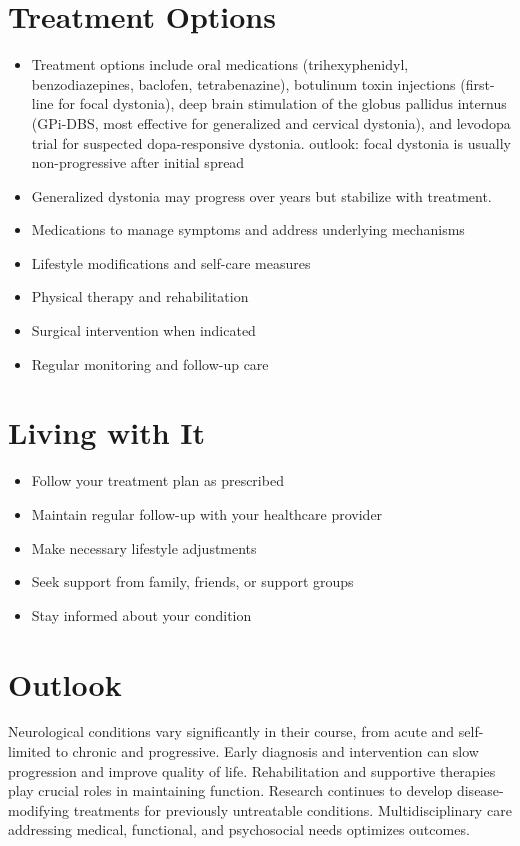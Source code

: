 \section{Treatment Options}
\begin{itemize}[noitemsep]
  \item Treatment options include oral medications (trihexyphenidyl, benzodiazepines, baclofen, tetrabenazine), botulinum toxin injections (first-line for focal dystonia), deep brain stimulation of the globus pallidus internus (GPi-DBS, most effective for generalized and cervical dystonia), and levodopa trial for suspected dopa-responsive dystonia. outlook: focal dystonia is usually non-progressive after initial spread
  \item Generalized dystonia may progress over years but stabilize with treatment.
  \item Medications to manage symptoms and address underlying mechanisms
  \item Lifestyle modifications and self-care measures
  \item Physical therapy and rehabilitation
  \item Surgical intervention when indicated
  \item Regular monitoring and follow-up care
\end{itemize}
\section{Living with It}
\begin{itemize}[noitemsep]
  \item Follow your treatment plan as prescribed
  \item Maintain regular follow-up with your healthcare provider
  \item Make necessary lifestyle adjustments
  \item Seek support from family, friends, or support groups
  \item Stay informed about your condition
\end{itemize}
\section{Outlook}
Neurological conditions vary significantly in their course, from acute and self-limited to chronic and progressive. Early diagnosis and intervention can slow progression and improve quality of life. Rehabilitation and supportive therapies play crucial roles in maintaining function. Research continues to develop disease-modifying treatments for previously untreatable conditions. Multidisciplinary care addressing medical, functional, and psychosocial needs optimizes outcomes.
